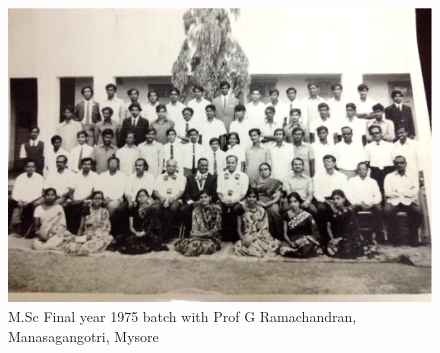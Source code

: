 \begin{figure}[H]
\centering
\includegraphics[scale=0.25]{src/images/chap8/8.eps}
\caption{M.Sc Final year 1975 batch with Prof G Ramachandran, Manasagangotri, Mysore}
\end{figure}





